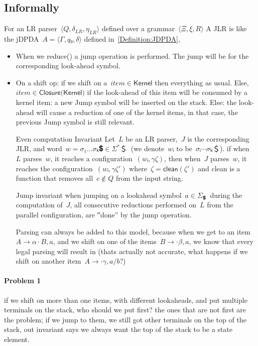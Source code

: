 \subsection{Informally}

For an LR parser~$⟨Q,δ_{LR}, η_{LR}⟩$ defined over a grammar~$⟨Ξ,ξ,R⟩$
A JLR is like the jDPDA~$A=⟨Γ,q₀,δ⟩$ defined in~\cref{Definition:JDPDA},

\begin{itemize}
  \item When we \textsf{reduce()} a jump operation is performed.
    The jump will be for the corresponding look-ahead symbol.
  \item On a shift op:
  if we shift on a~$item∈\textsf{Kernel}$
    then everything as usual.
  Else,~$item∈\textsf{Closure(Kernel)}$
      if the look-ahead of this item will be consumed by a kernel item:
        a new Jump symbol will be inserted on the stack.
      Else:
        the look-ahead will cause a reduction of one of the kernel items,
        in that case, the previous Jump symbol is still relevant.
  \item[Even computation Invariant]
    Let~$L$ be an LR parser,~$J$ is the corresponding JLR, and word~$w =σ₁…σₖ 💲∈Σ^*＄~$ (we denote~$wᵢ$ to be~$σᵢ⋯σₖ ＄$).
    if when~$L$ parses~$w$, it reaches a configuration~$(wᵢ,γζ)$,
    then when~$J$ parses~$w$, it reaches the configuration~$(wᵢ,γζ')$ where~$ζ= \textsf{clean}(ζ')$
    and \textsf{clean} is a function that removes all~$c∉Q$ from the input string.
  \item[Jump invariant]
    when jumping on a lookahead symbol~$a∈Σ_💲~$ during the computation of~$J$,
    all consecutive reductions performed on~$L$ from the parallel configuration, are ‟done” by the \textsf{jump} operation.
  \item[Parsing] can always be added to this model, because when we get to an item~$A→α·B,a$, and we shift on
    one of the items~$B→·β,a$, we know that every legal parsing will result in (thats actually not accurate, what happens
    if we shift on another item~$A→·γ,a/b$?)
\end{itemize}
\paragraph{Problem 1} if we shift on more than one items, with different lookaheads,
  and put multiple terminals on the stack, who should we put first? the ones that are
  not first are the problem; if we jump to them, we still got other terminals on the
  top of the stack, out invariant says we always want the top of the stack to be a
  state element.

